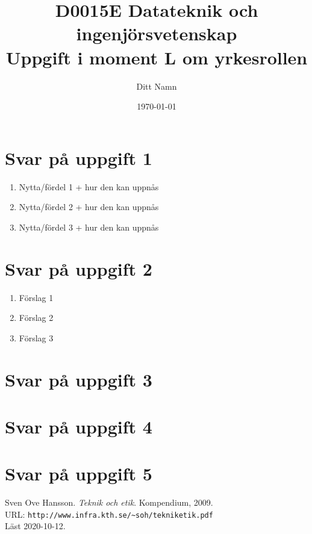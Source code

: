 \documentclass[a4paper,12pt]{article}
\title{D0015E Datateknik och ingenjörsvetenskap \\
       Uppgift i moment L om yrkesrollen}
\author{Ditt Namn}
\date{\today}
\begin{document}
\maketitle




\section*{Svar på uppgift 1}



\begin{enumerate}
  \item Nytta/fördel 1 + hur den kan uppnås
  \item Nytta/fördel 2 + hur den kan uppnås
  \item Nytta/fördel 3 + hur den kan uppnås
\end{enumerate}


\section*{Svar på uppgift 2}



\begin{enumerate}
  \item Förslag 1
  \item Förslag 2
  \item Förslag 3
\end{enumerate}
  
\section*{Svar på uppgift 3}





\section*{Svar på uppgift 4}




\section*{Svar på uppgift 5}




\begin{thebibliography}{99}
   Sven Ove Hansson. \emph{Teknik och etik}.
    Kompendium, 2009. \\
    URL: \verb|http://www.infra.kth.se/~soh/tekniketik.pdf| \\
    Läst 2020-10-12. 
  \end{thebibliography}
\end{document}
